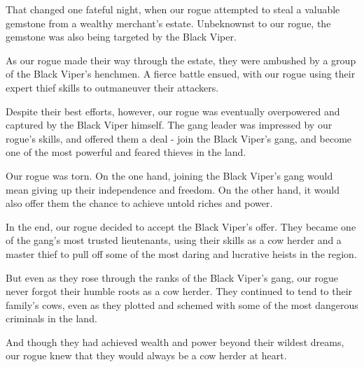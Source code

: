 \documentclass[ms,a4paper]{memoir}
\newcommand{\RED}[1]{\textcolor{red!50!black}{\MakeUppercase{#1}}}
\begin{document}
That changed one fateful night, when our rogue attempted to steal a valuable 
gemstone from a wealthy merchant's estate. Unbeknownst to our rogue, the 
gemstone was also being targeted by the Black Viper.

As our rogue made their way through the estate, they were ambushed by a group 
of the Black Viper's henchmen. A fierce battle ensued, with our rogue using
 their expert thief skills to outmaneuver their attackers.

Despite their best efforts, however, our rogue was eventually overpowered and 
captured by the Black Viper himself. The gang leader was impressed by our rogue's 
skills, and offered them a deal - join the Black Viper's gang, and become one 
of the most powerful and feared thieves in the land.

Our rogue was torn. On the one hand, joining the Black Viper's gang would mean
 giving up their independence and freedom. On the other hand, it would also offer 
 them the chance to achieve untold riches and power.

In the end, our rogue decided to accept the Black Viper's offer. They became 
one of the gang's most trusted lieutenants, using their skills as a cow herder 
and a master thief to pull off some of the most daring and lucrative heists in
 the region.

But even as they rose through the ranks of the Black Viper's gang, our rogue 
never forgot their humble roots as a cow herder. They continued to tend to their 
family's cows, even as they plotted and schemed with some of the most dangerous 
criminals in the land.

And though they had achieved wealth and power beyond their wildest dreams, our
 rogue knew that they would always be a cow herder at heart.


\end{document}
